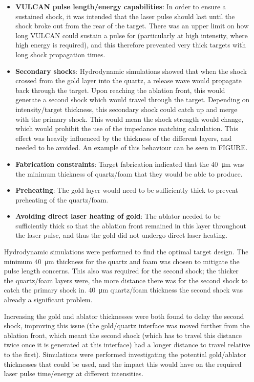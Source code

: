 \begin{itemize}
    \item \textbf{VULCAN pulse length/energy capabilities}: In order to ensure a sustained shock, it was intended that the laser pulse should last until the shock broke out from the rear of the target. There was an upper limit on how long VULCAN could sustain a pulse for (particularly at high intensity, where high energy is required), and this therefore prevented very thick targets with long shock propagation times.
    \item \textbf{Secondary shocks}: Hydrodynamic simulations showed that when the shock crossed from the gold layer into the quartz, a release wave would propagate back through the target. Upon reaching the ablation front, this would generate a second shock which would travel through the target. Depending on intensity/target thickness, this secondary shock could catch up and merge with the primary shock. This would mean the shock strength would change, which would prohibit the use of the impedance matching calculation. This effect was heavily influenced by the thickness of the different layers, and needed to be avoided. An example of this behaviour can be seen in FIGURE.
    \item \textbf{Fabrication constraints}: Target fabrication indicated that the 40~\unit{\micro\meter} was the minimum thickness of quartz/foam that they would be able to produce.
    \item \textbf{Preheating}: The gold layer would need to be sufficiently thick to prevent preheating of the quartz/foam. 
    \item \textbf{Avoiding direct laser heating of gold}: The ablator needed to be sufficiently thick so that the ablation front remained in this layer throughout the laser pulse, and thus the gold did not undergo direct laser heating.
\end{itemize}

Hydrodynamic simulations were performed to find the optimal target design. The minimum 40~\unit{\micro\meter} thickness for the quartz and foam was chosen to mitigate the pulse length concerns. This also was required for the second shock; the thicker the quartz/foam layers were, the more distance there was for the second shock to catch the primary shock in. 40~\unit{\micro\meter} quartz/foam thickness the second shock was already a significant problem. 

Increasing the gold and ablator thicknesses were both found to delay the second shock, improving this issue (the gold/quartz interface was moved further from the ablation front, which meant the second shock (which has to travel this distance twice once it is generated at this interface) had a longer distance to travel relative to the first). Simulations were performed investigating the potential gold/ablator thicknesses that could be used, and the impact this would have on the required laser pulse time/energy at different intensities.

